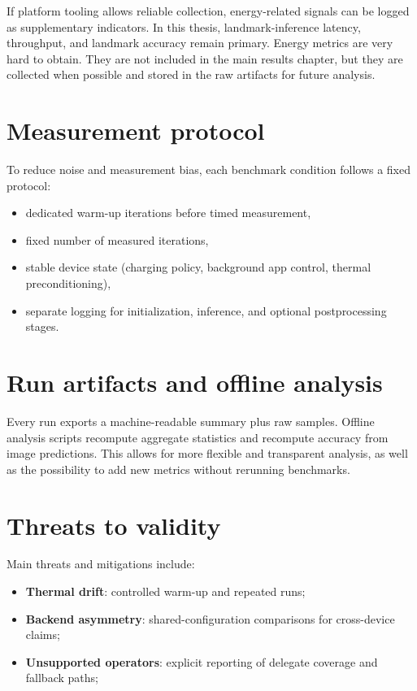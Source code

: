 If platform tooling allows reliable collection, energy-related signals can be
logged as supplementary indicators. In this thesis, landmark-inference
latency, throughput, and landmark accuracy remain primary. Energy metrics are very hard to obtain.
They are not included in the main results chapter, but they are collected when possible and stored in the raw artifacts for future analysis.
\section{Measurement protocol}

To reduce noise and measurement bias, each benchmark condition follows a fixed
protocol:
\begin{itemize}
    \item dedicated warm-up iterations before timed measurement,
    \item fixed number of measured iterations,
    \item stable device state (charging policy, background app control,
          thermal preconditioning),
    \item separate logging for initialization, inference, and optional
          postprocessing stages.
\end{itemize}

\section{Run artifacts and offline analysis}

Every run exports a machine-readable summary plus raw samples. Offline analysis
scripts recompute aggregate statistics and recompute accuracy
from image predictions. This allows for more flexible and transparent analysis, 
as well as the possibility to add new metrics without rerunning benchmarks.

\section{Threats to validity}

Main threats and mitigations include:
\begin{itemize}
    \item \textbf{Thermal drift}: controlled warm-up and repeated runs;
    \item \textbf{Backend asymmetry}: shared-configuration comparisons for
          cross-device claims;
    \item \textbf{Unsupported operators}: explicit reporting of delegate
          coverage and fallback paths;
\end{itemize}

